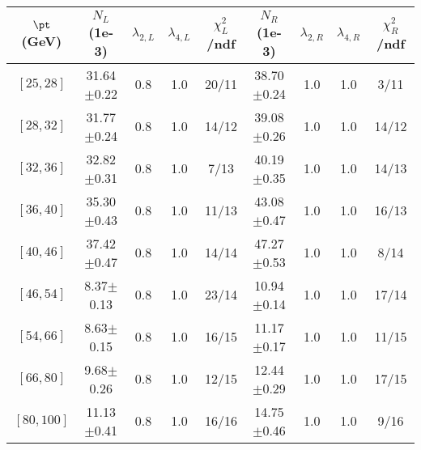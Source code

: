 \begin{tabular}{c||c|c|c|c||c|c|c|c}
$\pt$ (GeV) & $N_L$ (1e-3) & $\lambda_{2,L}$ & $\lambda_{4,L}$  & $\chi^2_L$/ndf & $N_R$ (1e-3) & $\lambda_{2,R}$ & $\lambda_{4,R}$  & $\chi^2_R$/ndf \\
\hline
$[25, 28]$ & 31.64$\pm$0.22 & 0.8 & 1.0 & 20/11 & 38.70$\pm$0.24 & 1.0 & 1.0 & 3/11\\
$[28, 32]$ & 31.77$\pm$0.24 & 0.8 & 1.0 & 14/12 & 39.08$\pm$0.26 & 1.0 & 1.0 & 14/12\\
$[32, 36]$ & 32.82$\pm$0.31 & 0.8 & 1.0 & 7/13 & 40.19$\pm$0.35 & 1.0 & 1.0 & 14/13\\
$[36, 40]$ & 35.30$\pm$0.43 & 0.8 & 1.0 & 11/13 & 43.08$\pm$0.47 & 1.0 & 1.0 & 16/13\\
$[40, 46]$ & 37.42$\pm$0.47 & 0.8 & 1.0 & 14/14 & 47.27$\pm$0.53 & 1.0 & 1.0 & 8/14\\
$[46, 54]$ & 8.37$\pm$0.13 & 0.8 & 1.0 & 23/14 & 10.94$\pm$0.14 & 1.0 & 1.0 & 17/14\\
$[54, 66]$ & 8.63$\pm$0.15 & 0.8 & 1.0 & 16/15 & 11.17$\pm$0.17 & 1.0 & 1.0 & 11/15\\
$[66, 80]$ & 9.68$\pm$0.26 & 0.8 & 1.0 & 12/15 & 12.44$\pm$0.29 & 1.0 & 1.0 & 17/15\\
$[80, 100]$ & 11.13$\pm$0.41 & 0.8 & 1.0 & 16/16 & 14.75$\pm$0.46 & 1.0 & 1.0 & 9/16\\
\end{tabular}

